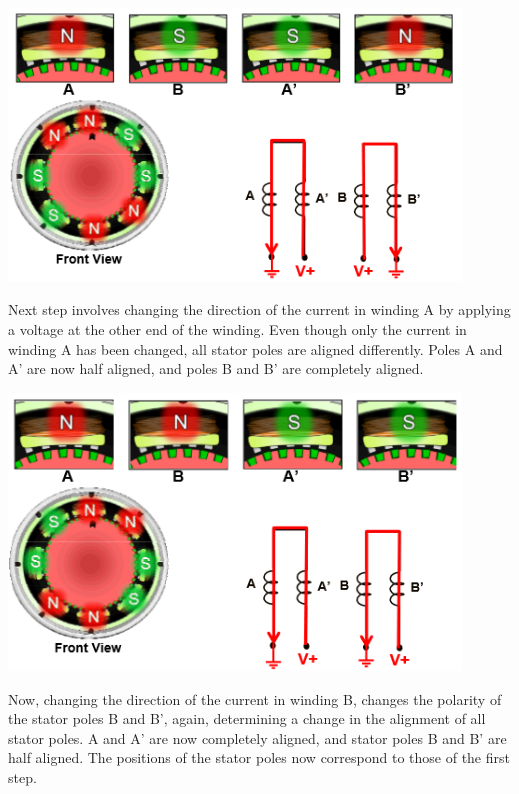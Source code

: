 \begin{center}
	\includegraphics[width=0.9\textwidth]{figures/move/motor33}
\end{center}

Next step involves changing the direction of the current in winding A by applying a voltage at the other end of the winding. Even though only the current in winding A has been changed, all stator poles are aligned differently. Poles A and A’ are now half aligned, and poles B and B’ are completely aligned.

\begin{center}
	\includegraphics[width=0.9\textwidth]{figures/move/motor34}
\end{center}

Now, changing the direction of the current in winding B, changes the polarity of the stator poles B and B', again, determining a change in the alignment of all stator poles. A and A’ are now completely aligned, and stator poles B and B’ are half aligned. The positions of the stator poles now correspond to those of the first step.

